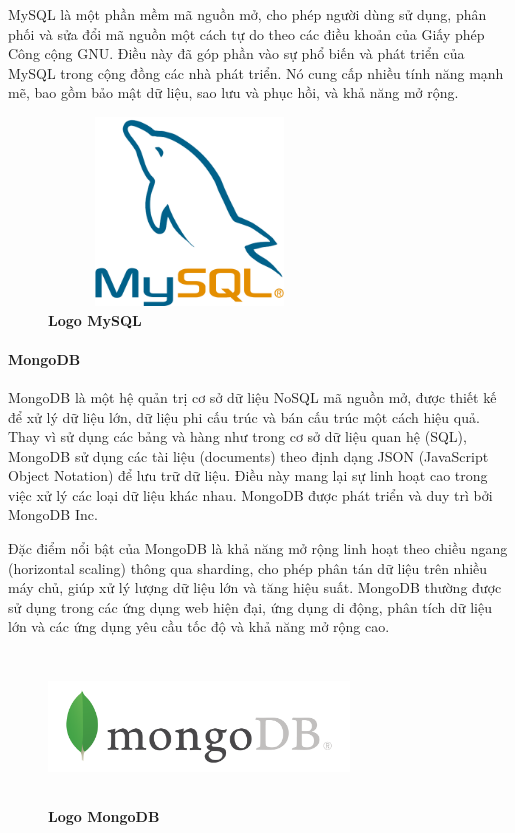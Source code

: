 MySQL là một phần mềm mã nguồn mở, cho phép người dùng sử dụng, phân phối và sửa đổi mã nguồn một cách tự do theo các điều khoản của Giấy phép Công cộng GNU. Điều này đã góp phần vào sự phổ biến và phát triển của MySQL trong cộng đồng các nhà phát triển. Nó cung cấp nhiều tính năng mạnh mẽ, bao gồm bảo mật dữ liệu, sao lưu và phục hồi, và khả năng mở rộng.

\begin{figure}[H]
  \centering
  \includegraphics[width=7.5cm,height=5cm]{Images/Technology/mysql.png}
  \caption[Logo MySQL]{\bfseries \fontsize{12pt}{0pt}
  \selectfont Logo MySQL}
  \label{mysql} %
\end{figure}

\paragraph{MongoDB}
\mbox{}

MongoDB là một hệ quản trị cơ sở dữ liệu NoSQL mã nguồn mở, được thiết kế để xử lý dữ liệu lớn, dữ liệu phi cấu trúc và bán cấu trúc một cách hiệu quả. Thay vì sử dụng các bảng và hàng như trong cơ sở dữ liệu quan hệ (SQL), MongoDB sử dụng các tài liệu (documents) theo định dạng JSON (JavaScript Object Notation) để lưu trữ dữ liệu. Điều này mang lại sự linh hoạt cao trong việc xử lý các loại dữ liệu khác nhau. MongoDB được phát triển và duy trì bởi MongoDB Inc.

Đặc điểm nổi bật của MongoDB là khả năng mở rộng linh hoạt theo chiều ngang (horizontal scaling) thông qua sharding, cho phép phân tán dữ liệu trên nhiều máy chủ, giúp xử lý lượng dữ liệu lớn và tăng hiệu suất. MongoDB thường được sử dụng trong các ứng dụng web hiện đại, ứng dụng di động, phân tích dữ liệu lớn và các ứng dụng yêu cầu tốc độ và khả năng mở rộng cao.

\begin{figure}[H]
  \centering
  \includegraphics[width=8cm,height=4cm]{Images/Technology/mongo.png}
  \caption[Logo MongoDB]{\bfseries \fontsize{12pt}{0pt}
  \selectfont Logo MongoDB}
  \label{mongodb} %
\end{figure}


